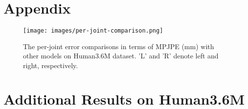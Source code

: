 \documentclass[10pt,twocolumn,letterpaper]{article}
\begin{document}
{\small


}
\appendix
\section*{Appendix}
\begin{figure}[!t]
          \centering
          \texttt{[image: images/per-joint-comparison.png]}
          \caption{The per-joint error comparisons in terms of MPJPE (mm) with other models on Human3.6M dataset. 'L' and 'R' denote left and right, respectively.}
          \label{fig:per-joint-error}
    \end{figure}
    \section{Additional Results on Human3.6M}
\end{document}

